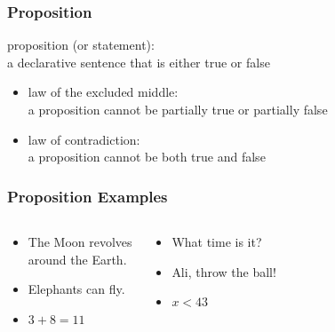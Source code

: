 \documentclass[dvipsnames]{beamer}
\begin{document}
\begin{frame}
  \frametitle{Proposition}

  \begin{definition}
    \alert{proposition} (or \alert{statement}):\\
      a declarative sentence that is either true or false
  \end{definition}

  \pause
  \begin{itemize}
    \item \alert{law of the excluded middle}:\\
      a proposition cannot be partially true or partially false
  \end{itemize}

  \pause
  \begin{itemize}
    \item \alert{law of contradiction}:\\
      a proposition cannot be both true and false
  \end{itemize}
\end{frame}

\begin{frame}
  \frametitle{Proposition Examples}

  \begin{columns}[t]
    \begin{example}[proposition]
      \begin{itemize}
        \item The Moon revolves\\
          around the Earth.
        \item Elephants can fly.
        \item $3+8=11$
      \end{itemize}
    \end{example}

    \pause
    \begin{example}
      \begin{itemize}
        \item What time is it?
        \item Ali, throw the ball!
        \item $x<43$
      \end{itemize}
    \end{example}
  \end{columns}
\end{frame}
\end{document}
